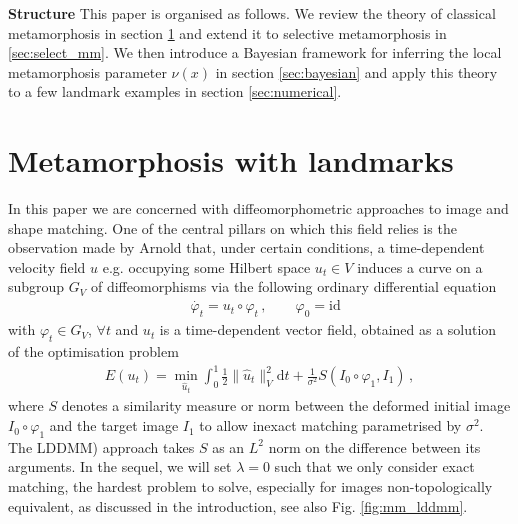 \documentclass[runningheads]{llncs}
\newcommand{\half}{\frac 12}
\newcommand{\norm}[2]{\| #1 \|_{ #2 }}
\newcommand{\vnorm}[1]{\norm{ #1 }{V}}
\newcommand{\diff}[1]{\text{d} #1}
\begin{document}
{\bf Structure} This paper is organised as follows. We review the theory of
classical metamorphosis in section \ref{sec:bg} and extend it to selective
metamorphosis in \ref{sec:select_mm}.  We then introduce a Bayesian framework
for inferring the local metamorphosis parameter $\nu(x)$ in section
\ref{sec:bayesian} and apply this theory to a few landmark examples in section
\ref{sec:numerical}.

\section{Metamorphosis with landmarks}\label{sec:bg}

In this paper we are concerned with diffeomorphometric approaches to image and
shape matching. One of the central pillars on which this field relies is the
observation made by Arnold \cite{arnold1966geometrie} that, under certain
conditions, a time-dependent velocity field $u$ e.g. occupying some Hilbert
space $u_t \in V$ induces a curve on a subgroup $G_V$ of diffeomorphisms
\cite{younes2010shapes} via the following ordinary differential equation
\begin{align}
& \dot{\varphi_t} = u_t \circ \varphi_t\, , \qquad  \varphi_0 = \text{id}
  \label{diffeo}
\end{align}
with $\varphi_t \in G_V$, $\forall t$ and $u_t$ is a time-dependent vector
field, obtained as a solution of the optimisation problem
\begin{align}
  E(u_t) = \min_{\hat u_t} \int_0^1 \half\vnorm{\hat u_t}^2 \diff{t} +
  \frac{1}{\sigma^2} S(I_0\circ\varphi_1, I_1)\, , \label{E-def}
\end{align}
where $S$ denotes a similarity measure or norm between the deformed initial
image $I_0\circ \varphi_1$ and the target image $I_1$ to allow inexact matching
parametrised by $\sigma^2$. The LDDMM) approach takes $S$ as an $L^2$ norm on the difference between
its arguments.
In the sequel, we will set $\lambda=0$ such that we
only consider exact matching, the hardest problem to solve, especially for
images non-topologically equivalent, as discussed in the introduction, see also
Fig. \ref{fig:mm_lddmm}.
\end{document}
